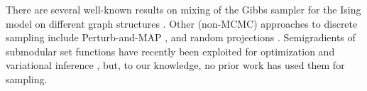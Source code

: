 There are several well-known results on mixing of the Gibbs sampler for the Ising model on different graph structures \citep{jerrum93,berger05,levin08,levin08book}.
Other (non-MCMC) approaches to discrete sampling include Perturb-and-MAP \citep{papandreou11,hazan13}, and random projections \citep{zhu15}.
Semigradients of submodular set functions have recently been exploited for optimization \citep{iyer13, jegelka11} and variational inference \citep{djolonga16}, but, to our knowledge, no prior work  has used them for sampling.


%
%
